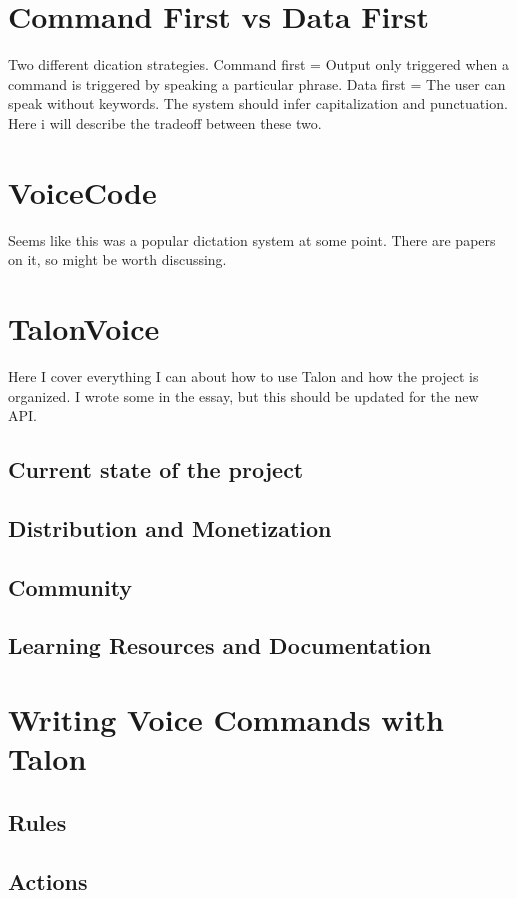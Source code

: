 \documentclass[a4paper,english]{ifimaster}
\begin{document}
\section{Command First vs Data First}
Two different dication strategies.
Command first = Output only triggered when a command is triggered by speaking a particular phrase.
Data first = The user can speak without keywords. The system should infer capitalization and punctuation.
Here i will describe the tradeoff between these two.

\section{VoiceCode}
Seems like this was a popular dictation system at some point. There are papers on it, so might be worth discussing.


\section{TalonVoice}
Here I cover everything I can about how to use Talon and how the project is organized.
I wrote some in the essay, but this should be updated for the new API.

\subsection{Current state of the project}
\subsection{Distribution and Monetization}
\subsection{Community}
\subsection{Learning Resources and Documentation}

\section{Writing Voice Commands with Talon}
\subsection{Rules}
\subsection{Actions}
\end{document}

